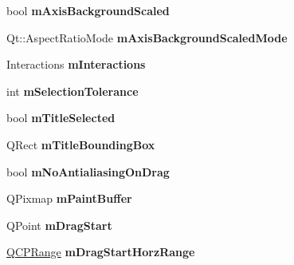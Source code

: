 \begin{DoxyCompactItemize}
\item 
\hypertarget{classQCustomPlot_a9f90d0ef937c05f9ec0266d10ab3645a}{bool {\bfseries m\-Axis\-Background\-Scaled}}\label{classQCustomPlot_a9f90d0ef937c05f9ec0266d10ab3645a}

\item 
\hypertarget{classQCustomPlot_a6fe1c87e0c2c9038bb9c0e75afe81920}{Qt\-::\-Aspect\-Ratio\-Mode {\bfseries m\-Axis\-Background\-Scaled\-Mode}}\label{classQCustomPlot_a6fe1c87e0c2c9038bb9c0e75afe81920}

\item 
\hypertarget{classQCustomPlot_a24daf819733de795fb13971405c68e07}{Interactions {\bfseries m\-Interactions}}\label{classQCustomPlot_a24daf819733de795fb13971405c68e07}

\item 
\hypertarget{classQCustomPlot_abc36e12dd0482117ad810a800c847722}{int {\bfseries m\-Selection\-Tolerance}}\label{classQCustomPlot_abc36e12dd0482117ad810a800c847722}

\item 
\hypertarget{classQCustomPlot_a6fac28ce7c2ec193ec4cf28a597d74c1}{bool {\bfseries m\-Title\-Selected}}\label{classQCustomPlot_a6fac28ce7c2ec193ec4cf28a597d74c1}

\item 
\hypertarget{classQCustomPlot_ac2dcb916aeb80afa18b5c393c6d4145a}{Q\-Rect {\bfseries m\-Title\-Bounding\-Box}}\label{classQCustomPlot_ac2dcb916aeb80afa18b5c393c6d4145a}

\item 
\hypertarget{classQCustomPlot_ac83df968435f6b8ec79f2993ab9124e8}{bool {\bfseries m\-No\-Antialiasing\-On\-Drag}}\label{classQCustomPlot_ac83df968435f6b8ec79f2993ab9124e8}

\item 
\hypertarget{classQCustomPlot_a753630df96e0672098d9e88bd41d1913}{Q\-Pixmap {\bfseries m\-Paint\-Buffer}}\label{classQCustomPlot_a753630df96e0672098d9e88bd41d1913}

\item 
\hypertarget{classQCustomPlot_a87a4170d25010165305766f6331c9814}{Q\-Point {\bfseries m\-Drag\-Start}}\label{classQCustomPlot_a87a4170d25010165305766f6331c9814}

\item 
\hypertarget{classQCustomPlot_af66d42e3013858bdad8899d83647de36}{\hyperlink{classQCPRange}{Q\-C\-P\-Range} {\bfseries m\-Drag\-Start\-Horz\-Range}}\label{classQCustomPlot_af66d42e3013858bdad8899d83647de36}


\end{DoxyCompactItemize}

